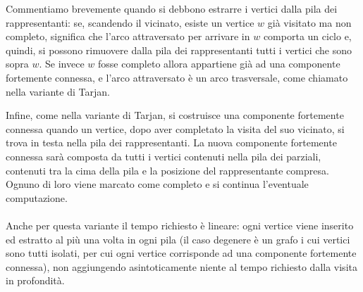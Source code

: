 Commentiamo brevemente quando si debbono estrarre i vertici dalla pila
dei rappresentanti: se, scandendo il vicinato, esiste un vertice $w$
gi\`a visitato ma non completo, significa che l'arco attraversato per
arrivare in $w$ comporta un ciclo e, quindi, si possono rimuovere
dalla pila dei rappresentanti tutti i vertici che sono sopra $w$. Se
invece $w$ fosse completo allora appartiene gi\`a ad una componente
fortemente connessa, e l'arco attraversato \`e un arco trasversale,
come chiamato nella variante di Tarjan.

Infine, come nella variante di Tarjan, si costruisce una componente
fortemente connessa quando un vertice, dopo aver completato la visita
del suo vicinato, si trova in testa nella pila dei rappresentanti. La
nuova componente fortemente connessa sar\`a composta da tutti i
vertici contenuti nella pila dei parziali, contenuti tra la cima della
pila e la posizione del rappresentante compresa. Ognuno di loro viene
marcato come completo e si continua l'eventuale computazione.
\\\\
Anche per questa variante il tempo richiesto \`e lineare: ogni vertice
viene inserito ed estratto al pi\`u una volta in ogni pila (il caso
degenere \`e un grafo i cui vertici sono tutti isolati, per cui ogni
vertice corrisponde ad una componente fortemente connessa), non
aggiungendo asintoticamente niente al tempo richiesto dalla visita in
profondit\`a.




